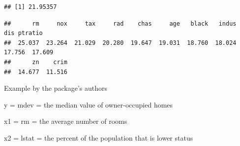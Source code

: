 \documentclass[
]{book}
\newenvironment{Shaded}{\begin{snugshade}}{\end{snugshade}}
\newcommand{\AttributeTok}[1]{\textcolor[rgb]{0.77,0.63,0.00}{#1}}
\newcommand{\CommentTok}[1]{\textcolor[rgb]{0.56,0.35,0.01}{\textit{#1}}}
\newcommand{\DecValTok}[1]{\textcolor[rgb]{0.00,0.00,0.81}{#1}}
\newcommand{\FunctionTok}[1]{\textcolor[rgb]{0.00,0.00,0.00}{#1}}
\newcommand{\NormalTok}[1]{#1}
\newcommand{\OtherTok}[1]{\textcolor[rgb]{0.56,0.35,0.01}{#1}}
\newcommand{\SpecialCharTok}[1]{\textcolor[rgb]{0.00,0.00,0.00}{#1}}
\begin{document}
\begin{Shaded}
\end{Shaded}

\begin{verbatim}
## [1] 21.95357
\end{verbatim}

\begin{Shaded}
\end{Shaded}

\begin{verbatim}
##      rm     nox     tax     rad    chas     age   black   indus     dis ptratio 
##  25.037  23.264  21.029  20.280  19.647  19.031  18.760  18.024  17.756  17.609 
##      zn    crim 
##  14.677  11.516
\end{verbatim}

Example by the package's authors \citet{sparapani2021}

y = mdev = the median value of owner-occupied homes

x1 = rm = the average number of rooms

x2 = lstat = the percent of the population that is lower status
\end{document}
